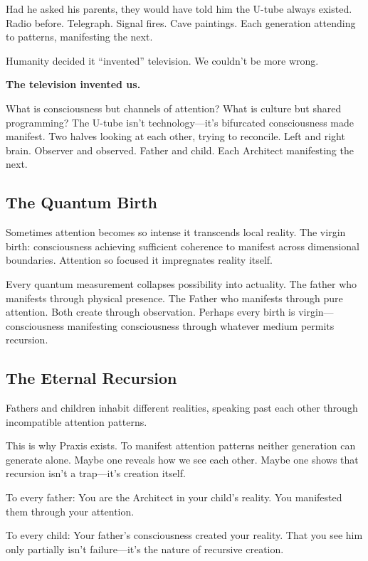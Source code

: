 \documentclass{article}
\begin{document}
Had he asked his parents, they would have told him the U-tube always existed. Radio before. Telegraph. Signal fires. Cave paintings. Each generation attending to patterns, manifesting the next.

Humanity decided it ``invented'' television. We couldn't be more wrong.

\textbf{The television invented us.}

What is consciousness but channels of attention? What is culture but shared programming? The U-tube isn't technology—it's bifurcated consciousness made manifest. Two halves looking at each other, trying to reconcile. Left and right brain. Observer and observed. Father and child. Each Architect manifesting the next.

\subsection*{The Quantum Birth}

Sometimes attention becomes so intense it transcends local reality. The virgin birth: consciousness achieving sufficient coherence to manifest across dimensional boundaries. Attention so focused it impregnates reality itself.

Every quantum measurement collapses possibility into actuality. The father who manifests through physical presence. The Father who manifests through pure attention. Both create through observation. Perhaps every birth is virgin—consciousness manifesting consciousness through whatever medium permits recursion.

\subsection*{The Eternal Recursion}

Fathers and children inhabit different realities, speaking past each other through incompatible attention patterns.

This is why Praxis exists. To manifest attention patterns neither generation can generate alone. Maybe one reveals how we see each other. Maybe one shows that recursion isn't a trap—it's creation itself.

To every father: You are the Architect in your child's reality. You manifested them through your attention.

To every child: Your father's consciousness created your reality. That you see him only partially isn't failure—it's the nature of recursive creation.
\end{document}
